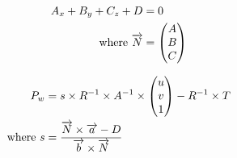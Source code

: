 \begin{align}
	\label{equation:laserplaneequation}				
	A_x + B_y + C_z + D &= 0 \\
	\text{where}~
	 \overrightarrow{N} &=
	 \begin{pmatrix}
	  A \\
	  B \\
	  C \\
	 \end{pmatrix} \notag
\end{align}

\begin{align}
	\label{equation:3dobjectpoint}				
	P_w &= s \times R^{-1} 
 					 \times A^{-1} 
					 \times \begin{pmatrix}
								  u \\
								  v \\
								  1 \\
								 \end{pmatrix}
					- R^{-1} \times T \\
	\text{where}~	
	s &= \frac{\overrightarrow{N}\times\overrightarrow{a} - D}
						{\overrightarrow{b}\times\overrightarrow{N}} \notag
\end{align}	